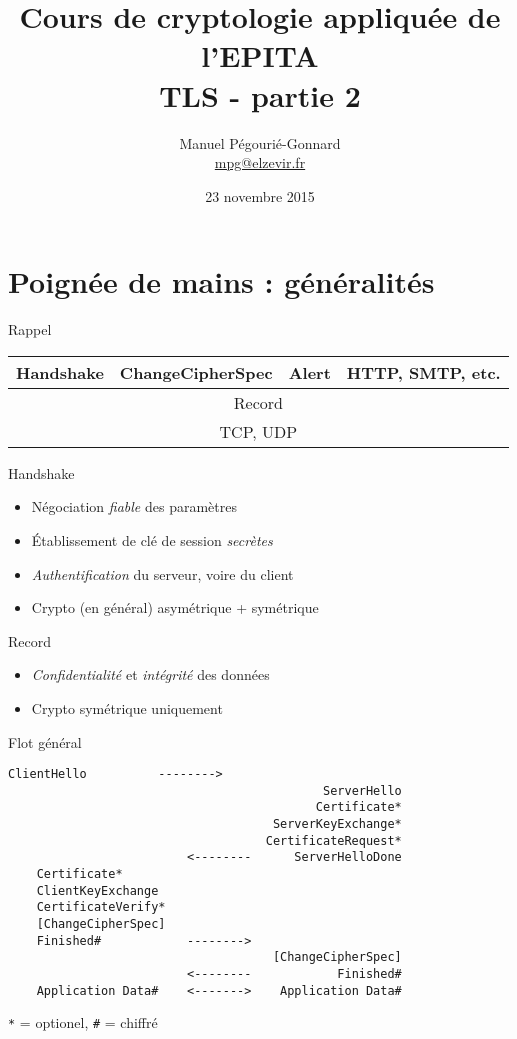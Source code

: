 \documentclass{mpg-ep-slides}
\author[MPG]{Manuel Pégourié-Gonnard\\
  \href{mailto:mpg@elzevir.fr}{{mpg@elzevir.fr}}
}
\institute[ARM]{\normalsize ARM France - IoT - mbed TLS}
\title{Cours de cryptologie appliquée de l'EPITA \\ TLS - partie 2}
\date{23 novembre 2015}
\begin{document}
\lictitle

\section[Handshake]{Poignée de mains : généralités}
\tocsect

\begin{frame}{Rappel}
  \begin{center}
    \renewcommand\arraystretch{1.5}
    \begin{tabular}{|c|c|c|c|}
      \hline
      Handshake & ChangeCipherSpec & Alert &
      \multicolumn{1}{|c|}{ \color{gray} HTTP, SMTP, etc. } \\ \hline
      \multicolumn{4}{|c|}{Record} \\ \hline
      \multicolumn{4}{|c|}{\color{gray} TCP, UDP} \\ \hline
    \end{tabular}
  \end{center}

  \begin{block}{Handshake}
    \begin{itemize}
      \item Négociation \emph{fiable} des paramètres
      \item Établissement de clé de session \emph{secrètes}
      \item \emph{Authentification} du serveur, voire du client
      \item Crypto (en général) asymétrique + symétrique
    \end{itemize}
  \end{block}
  \begin{block}{Record}
    \begin{itemize}
      \item \emph{Confidentialité} et \emph{intégrité} des données
      \item Crypto symétrique uniquement
    \end{itemize}
  \end{block}
\end{frame}

\begin{frame}[containsverbatim]{Flot général}
  \begin{Verbatim}[gobble=4, fontsize=\small]
    ClientHello          -------->
                                            ServerHello
                                           Certificate*
                                     ServerKeyExchange*
                                    CertificateRequest*
                         <--------      ServerHelloDone
    Certificate*
    ClientKeyExchange
    CertificateVerify*
    [ChangeCipherSpec]
    Finished#            -------->
                                     [ChangeCipherSpec]
                         <--------            Finished#
    Application Data#    <------->    Application Data#
  \end{Verbatim}
  \texttt{*} = optionel, \texttt{\#} = chiffré
\end{frame}
\end{document}
